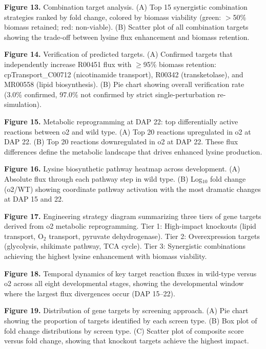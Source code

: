 \textbf{Figure 13.} Combination target analysis. (A) Top 15 synergistic combination strategies ranked by fold change, colored by biomass viability (green: $>$50\% biomass retained; red: non-viable). (B) Scatter plot of all combination targets showing the trade-off between lysine flux enhancement and biomass retention.
\label{fig:combo_targets}

\textbf{Figure 14.} Verification of predicted targets. (A) Confirmed targets that independently increase R00451 flux with $\geq$95\% biomass retention: cpTransport\_C00712 (nicotinamide transport), R00342 (transketolase), and MR00558 (lipid biosynthesis). (B) Pie chart showing overall verification rate (3.0\% confirmed, 97.0\% not confirmed by strict single-perturbation re-simulation).
\label{fig:verification}

\textbf{Figure 15.} Metabolic reprogramming at DAP 22: top differentially active reactions between o2 and wild type. (A) Top 20 reactions upregulated in o2 at DAP 22. (B) Top 20 reactions downregulated in o2 at DAP 22. These flux differences define the metabolic landscape that drives enhanced lysine production.
\label{fig:dap22_reprog}

\textbf{Figure 16.} Lysine biosynthetic pathway heatmap across development. (A) Absolute flux through each pathway step in wild type. (B) Log$_{10}$ fold change (o2/WT) showing coordinate pathway activation with the most dramatic changes at DAP 15 and 22.
\label{fig:pathway_heatmap}

\textbf{Figure 17.} Engineering strategy diagram summarizing three tiers of gene targets derived from o2 metabolic reprogramming. Tier 1: High-impact knockouts (lipid transport, O$_2$ transport, pyruvate dehydrogenase). Tier 2: Overexpression targets (glycolysis, shikimate pathway, TCA cycle). Tier 3: Synergistic combinations achieving the highest lysine enhancement with biomass viability.
\label{fig:strategy_diagram}

\textbf{Figure 18.} Temporal dynamics of key target reaction fluxes in wild-type versus o2 across all eight developmental stages, showing the developmental window where the largest flux divergences occur (DAP 15--22).
\label{fig:temporal_dynamics}

\textbf{Figure 19.} Distribution of gene targets by screening approach. (A) Pie chart showing the proportion of targets identified by each screen type. (B) Box plot of fold change distributions by screen type. (C) Scatter plot of composite score versus fold change, showing that knockout targets achieve the highest impact.
\label{fig:screen_distribution}
